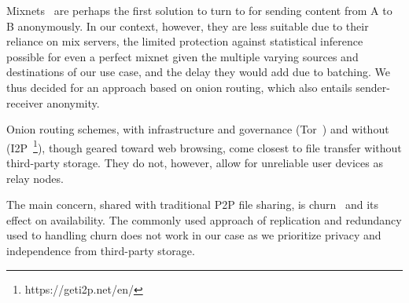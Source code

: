 Mixnets~\cite{Chaum:1981} are perhaps the first solution to turn to for sending content from A to B anonymously. In our context, however, they are less suitable due to their reliance on mix servers, the limited protection against statistical inference possible for even a perfect mixnet given the multiple varying sources and destinations of our use case, and the delay they would add due to batching. We thus decided for an approach based on onion routing, which also entails sender-receiver anonymity.

Onion routing schemes, with infrastructure and governance (Tor~\cite{Tor}) and without (I2P~\footnote{https://geti2p.net/en/}), though geared toward web browsing, come closest to file transfer without third-party storage. They do not, however, allow for unreliable user devices as relay nodes. 

The main concern, shared with traditional P2P file sharing, is churn~\cite{dhtchurn} and its effect on availability. %
The commonly used approach of replication and redundancy used to handling churn does not work in our case as we prioritize privacy and independence from third-party storage.  




